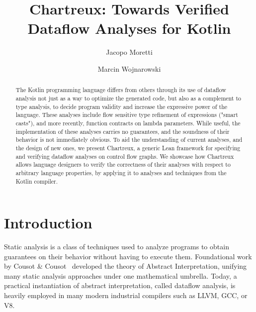 \documentclass[runningheads]{llncs}
\begin{document}
\title{Chartreux: Towards Verified Dataflow Analyses for Kotlin}
\author{Jacopo Moretti \and Marcin Wojnarowski}
\maketitle

\begin{abstract}
The Kotlin programming language differs from others through its use of
dataflow analysis not just as a way to optimize the generated code, but also
as a complement to type analysis, to decide program validity and increase
the expressive power of the language. These analyses include flow sensitive
type refinement of expressions ("smart casts"), and more recently, function
contracts on lambda parameters. While useful, the implementation of these
analyses carries no guarantees, and the soundness of their behavior is not
immediately obvious. To aid the understanding of current analyses, and the
design of new ones, we present Chartreux, a generic Lean framework for
specifying and verifying dataflow analyses on control flow graphs. We
showcase how Chartreux allows language designers to verify the correctness
of their analyses with respect to arbitrary language properties, by applying
it to analyses and techniques from the Kotlin compiler.
  
\end{abstract}



\section{Introduction}
\label{sec:intro}

Static analysis is a class of techniques used to analyze programs to obtain guarantees on their behavior without having to execute them. Foundational work by Cousot \& Cousot~\cite{Cousots} developed the theory of Abstract Interpretation, unifying many static analysis approaches under one mathematical umbrella. Today, a practical instantiation of abstract interpretation, called dataflow analysis, is heavily employed in many modern industrial compilers such as LLVM, GCC, or V8.
\end{document}
